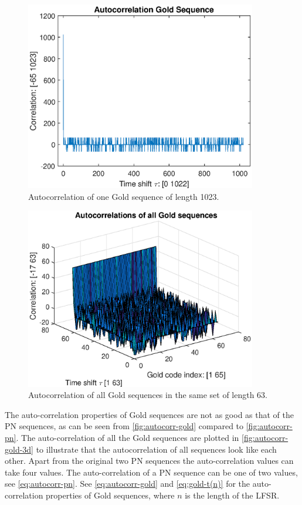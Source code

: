 \begin{figure}[tbp]
	\centering
	\includegraphics[width=0.9\textwidth]{chapters/cdma-chapters/codes/autocorr-gold.eps}
	\caption{Autocorrelation of one Gold sequence of length 1023.}
	\label{fig:autocorr-gold}
\end{figure}


\begin{figure}[tbp]
	\centering
	\includegraphics[width=0.9\textwidth]{chapters/cdma-chapters/codes/autocorr-gold-3d.eps}
	\caption{Autocorrelation of all Gold sequences in the same set of length 63.}
	\label{fig:autocorr-gold-3d}
\end{figure}




The auto-correlation properties of Gold sequences are not as good as that of the PN sequences, as can be seen from \autoref{fig:autocorr-gold} compared to \autoref{fig:autocorr-pn}.
The auto-correlation of all the Gold sequences are plotted in \autoref{fig:autocorr-gold-3d} to illustrate that the autocorrelation of all sequences look like each other.
Apart from the original two PN sequences the auto-correlation values can take four values.
The auto-correlation of a PN sequence can be one of two values, see \autoref{eq:autocorr-pn}.
See \autoref{eq:autocorr-gold} and \autoref{eq:gold-t(n)} for the auto-correlation properties of Gold sequences, where $n$ is the length of the LFSR.

